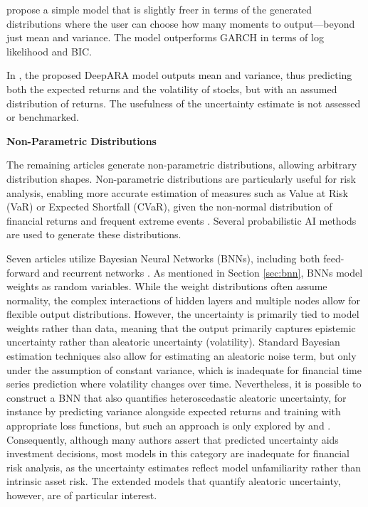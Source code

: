 \textcite{Horenko2020} propose a simple model that is slightly freer in terms of the generated distributions where the user can choose how many moments to output—beyond just mean and variance. The model outperforms GARCH in terms of log likelihood and BIC.

In \textcite{Li2024DeepAR}, the proposed DeepARA model outputs mean and variance, thus predicting both the expected returns and the volatility of stocks, but with an assumed distribution of returns. The usefulness of the uncertainty estimate is not assessed or benchmarked.

\textbf{Non-Parametric Distributions}

The remaining \distributionalnonparametric articles generate non-parametric distributions, allowing arbitrary distribution shapes. Non-parametric distributions are particularly useful for risk analysis, enabling more accurate estimation of measures such as Value at Risk (VaR) or Expected Shortfall (CVaR), given the non-normal distribution of financial returns and frequent extreme events \parencite{Peir1994TheDO}. Several probabilistic AI methods are used to generate these distributions.

Seven articles utilize Bayesian Neural Networks (BNNs), including both feed-forward and recurrent networks \parencite{cocco2021predictions, Hassan2024Bitcoin, Golnari2024Cryptocurrency, soleymani2022longterm, Dixon2022Industrial, chandra2021bayesian, hortua2024forecasting}. As mentioned in Section \ref{sec:bnn}, BNNs model weights as random variables. While the weight distributions often assume normality, the complex interactions of hidden layers and multiple nodes allow for flexible output distributions. However, the uncertainty is primarily tied to model weights rather than data, meaning that the output primarily captures epistemic uncertainty rather than aleatoric uncertainty (volatility). Standard Bayesian estimation techniques also allow for estimating an aleatoric noise term, but only under the assumption of constant variance, which is inadequate for financial time series prediction where volatility changes over time. Nevertheless, it is possible to construct a BNN that also quantifies heteroscedastic aleatoric uncertainty, for instance by predicting variance alongside expected returns and training with appropriate loss functions, but such an approach is only explored by \textcite{hortua2024forecasting} and \textcite{soleymani2022longterm}. Consequently, although many authors assert that predicted uncertainty aids investment decisions, most models in this category are inadequate for financial risk analysis, as the uncertainty estimates reflect model unfamiliarity rather than intrinsic asset risk. The extended models that quantify aleatoric uncertainty, however, are of particular interest.

